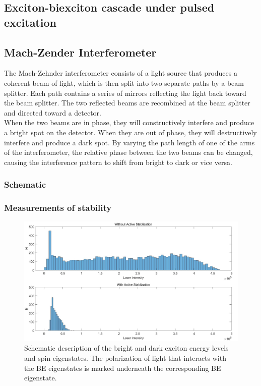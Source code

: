 \subsection{Exciton-biexciton cascade under pulsed excitation}
\subsection{Mach-Zender Interferometer}
The Mach-Zehnder interferometer consists of a light source that produces a coherent beam of light, which is then split into two separate paths by a beam splitter. Each path contains a series of mirrors reflecting the light back toward the beam splitter. The two reflected beams are recombined at the beam splitter and directed toward a detector.\\
When the two beams are in phase, they will constructively interfere and produce a bright spot on the detector. When they are out of phase, they will destructively interfere and produce a dark spot. By varying the path length of one of the arms of the interferometer, the relative phase between the two beams can be changed, causing the interference pattern to shift from bright to dark or vice versa.
\subsubsection{Schematic}

\subsubsection{Measurements of stability}
\begin{figure}[H]
	\centering
	\includegraphics[scale=0.32]{figures/StablizationHistogram.jpg}
	\caption{Schematic description of the bright and dark exciton energy levels and spin eigenstates. The polarization of light that interacts with the BE eigenstates is marked underneath the corresponding BE eigenstate.}
	\label{fig:stablization_histogram}
\end{figure}
